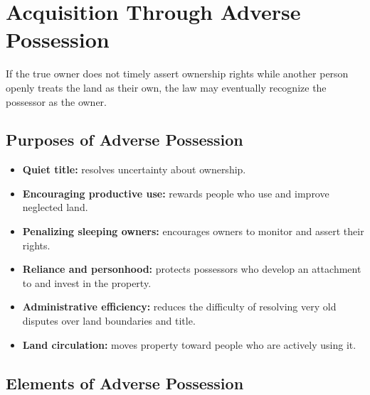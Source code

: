 \documentclass[11pt]{tex/lawoutline}
\begin{document}
\section{Acquisition Through Adverse Possession}

{
If the true owner does not timely assert ownership rights while another person openly treats the land as their own, the law may eventually recognize the possessor as the owner.
}

\subsection{Purposes of Adverse Possession}{
\begin{itemize}
    \item \textbf{Quiet title:} resolves uncertainty about ownership.
    \item \textbf{Encouraging productive use:} rewards people who use and improve neglected land.
    \item \textbf{Penalizing sleeping owners:} encourages owners to monitor and assert their rights.
    \item \textbf{Reliance and personhood:} protects possessors who develop an attachment to and invest in the property.
    \item \textbf{Administrative efficiency:} reduces the difficulty of resolving very old disputes over land boundaries and title.
    \item \textbf{Land circulation:} moves property toward people who are actively using it.
\end{itemize}
}

\subsection{Elements of Adverse Possession}
\end{document}
